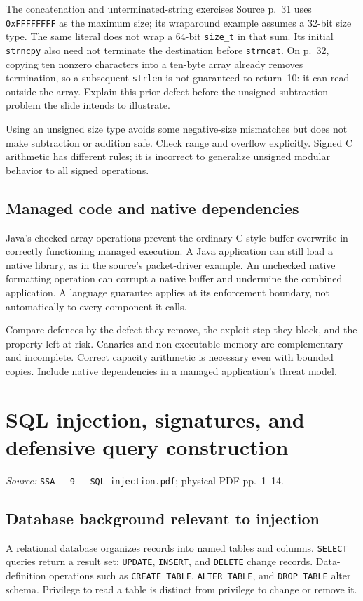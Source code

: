 \documentclass[11pt,a4paper]{article}
\newcommand{\currentmodule}{Contents}
\newcommand{\source}[2]{\textcolor{muted}{\small\textit{Source:} \nolinkurl{#1}; physical PDF pp.~#2.}\par\medskip}
\newcommand{\module}[2]{\par\Needspace{8\baselineskip}\gdef\currentmodule{#1}\section{#1}\label{#2}}
\numberwithin{figure}{section}
\begin{document}
\begin{correction}{The concatenation and unterminated-string exercises}
Source p.~31 uses \texttt{0xFFFFFFFF} as the maximum size; its wraparound example assumes a 32-bit size type. The same literal does not wrap a 64-bit \texttt{size\_t} in that sum. Its initial \texttt{strncpy} also need not terminate the destination before \texttt{strncat}. On p.~32, copying ten nonzero characters into a ten-byte array already removes termination, so a subsequent \texttt{strlen} is not guaranteed to return~10: it can read outside the array. Explain this prior defect before the unsigned-subtraction problem the slide intends to illustrate.
\end{correction}

Using an unsigned size type avoids some negative-size mismatches but does not make subtraction or addition safe. Check range and overflow explicitly. Signed C arithmetic has different rules; it is incorrect to generalize unsigned modular behavior to all signed operations.

\subsection{Managed code and native dependencies}
Java's checked array operations prevent the ordinary C-style buffer overwrite in correctly functioning managed execution. A Java application can still load a native library, as in the source's packet-driver example. An unchecked native formatting operation can corrupt a native buffer and undermine the combined application. A language guarantee applies at its enforcement boundary, not automatically to every component it calls.

\begin{takeaway}
Compare defences by the defect they remove, the exploit step they block, and the property left at risk. Canaries and non-executable memory are complementary and incomplete. Correct capacity arithmetic is necessary even with bounded copies. Include native dependencies in a managed application's threat model.
\end{takeaway}

\module{SQL injection, signatures, and defensive query construction}{sec:sql}
\source{SSA - 9 - SQL injection.pdf}{1--14}
\subsection{Database background relevant to injection}
A relational database organizes records into named tables and columns. \texttt{SELECT} queries return a result set; \texttt{UPDATE}, \texttt{INSERT}, and \texttt{DELETE} change records. Data-definition operations such as \texttt{CREATE TABLE}, \texttt{ALTER TABLE}, and \texttt{DROP TABLE} alter schema. Privilege to read a table is distinct from privilege to change or remove it.
\end{document}
